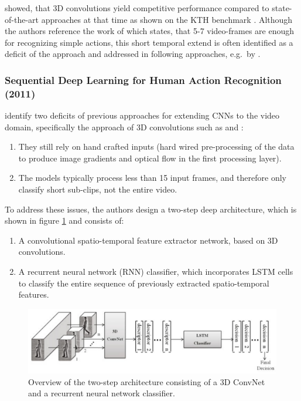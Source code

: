 \textcite{ji_3d_2013} showed, that 3D convolutions yield competitive performance compared to state-of-the-art approaches at that time as shown on the KTH benchmark \cite{schuldt_recognizing_2004}.
Although the authors reference the work of \textcite{schindler_action_2008} which states, that 5-7 video-frames are enough for recognizing simple actions, this short temporal extend is often identified as a deficit of the approach and addressed in following approaches, e.g.\ by \textcite{baccouche_sequential_2011}.


\subsubsection{Sequential Deep Learning for Human Action Recognition (2011)}
\textcite{baccouche_sequential_2011} identify two deficits of previous approaches for extending CNNs to the video domain, specifically the approach of 3D convolutions such as \cite{ji_3d_2013} and \cite{kim_human_2007}:
\begin{enumerate}
    \item They still rely on hand crafted inputs (hard wired pre-processing of the data to produce image gradients and optical flow in the first processing layer).
    \item The models typically process less than 15 input frames, and therefore only classify short sub-clips, not the entire video.
\end{enumerate}

To address these issues, the authors design a two-step deep architecture, which is shown in figure \ref{fig:sequentialdeep_overview} and consists of:
\begin{enumerate}
    \item A convolutional spatio-temporal feature extractor network, based on 3D convolutions.
    \item A recurrent neural network (RNN) classifier, which incorporates LSTM cells \cite{hochreiter_long_1997} to classify the entire sequence of previously extracted spatio-temporal features.
\end{enumerate}

\begin{figure}[H]
    \centering
    \includegraphics[width=\textwidth]{img_deep/sequentialdeep_overview.png}
    \caption{Overview of the two-step architecture consisting of a 3D ConvNet and a recurrent neural network classifier. \cite{baccouche_sequential_2011}}
    \label{fig:sequentialdeep_overview}
\end{figure}

